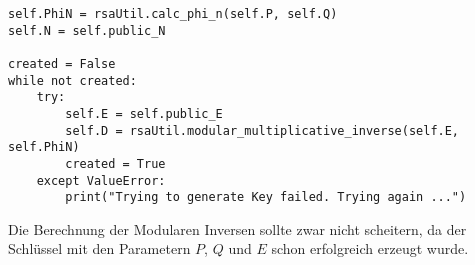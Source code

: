             \begin{lstlisting}[language=PyBrIM]
self.PhiN = rsaUtil.calc_phi_n(self.P, self.Q)
self.N = self.public_N

created = False
while not created:
    try:
        self.E = self.public_E
        self.D = rsaUtil.modular_multiplicative_inverse(self.E, self.PhiN)
        created = True
    except ValueError:
        print("Trying to generate Key failed. Trying again ...")
            \end{lstlisting}
             Die Berechnung der Modularen Inversen sollte zwar nicht scheitern, da der Schlüssel mit den Parametern $P$, $Q$ und $E$ schon erfolgreich erzeugt wurde.

        
             

